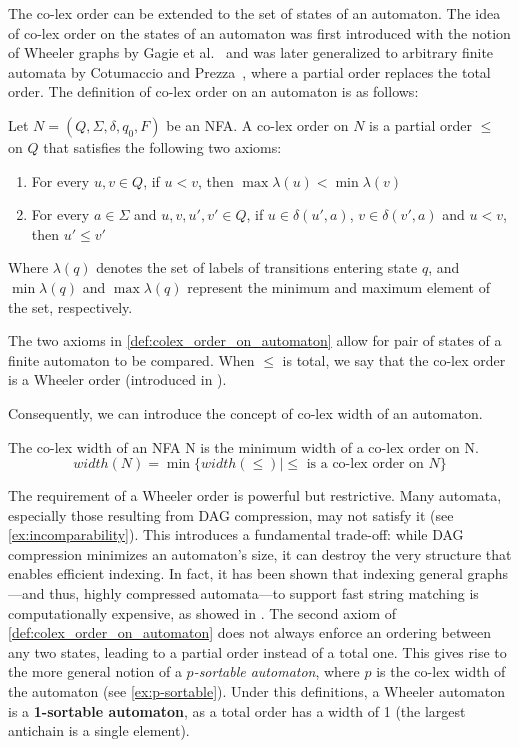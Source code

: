 The co-lex order can be extended to the set of states of an automaton. The idea of co-lex order on the states of an automaton was first introduced with the notion of Wheeler graphs by Gagie et al.~\cite{gagie2017wheeler} and was later generalized to arbitrary finite automata by Cotumaccio and Prezza~\cite{cotumaccio2021indexing}, where a partial order replaces the total order. The definition of co-lex order on an automaton is as follows:

\begin{definition}
    \label{def:colex_order_on_automaton}
    Let $N = (Q, \Sigma, \delta, q_0, F)$ be an NFA. A co-lex order on $N$ is a partial order $\leq$ on $Q$ that satisfies the following two axioms:
    \begin{enumerate}[leftmargin=25pt]
        \item For every $u, v \in Q$, if $u < v$, then $\max\lambda(u) < \min\lambda(v)$
        \item For every $a \in \Sigma$ and $u, v, u', v' \in Q$, if $u \in \delta(u', a)$, $v \in \delta(v', a)$ and $u < v$, then $u' \leq v'$
    \end{enumerate}
\end{definition}
Where $\lambda(q)$ denotes the set of labels of transitions entering state $q$, and $\min\lambda(q)$ and $\max\lambda(q)$ represent the minimum and maximum element of the set, respectively.

The two axioms in \cref{def:colex_order_on_automaton} allow for pair of states of a finite automaton to be compared. When $\leq$ is total, we say that the co-lex order is a Wheeler order (introduced in \cite{gagie2017wheeler}). 

Consequently, we can introduce the concept of co-lex width of an automaton.
\begin{definition}
    The co-lex width of an NFA N is the minimum width of a co-lex order on N.
    $$
        width(N) = \min \{width(\leq)|\leq \text{ is a co-lex order on } N\}
    $$
\end{definition}

The requirement of a Wheeler order is powerful but restrictive. Many automata, especially those resulting from DAG compression, may not satisfy it (see \cref{ex:incomparability}). This introduces a fundamental trade-off: while DAG compression minimizes an automaton's size, it can destroy the very structure that enables efficient indexing. In fact, it has been shown that indexing general graphs—and thus, highly compressed automata—to support fast string matching is computationally expensive, as showed in \cite{equiGraphsCannotBe2023}. The second axiom of \cref{def:colex_order_on_automaton} does not always enforce an ordering between any two states, leading to a partial order instead of a total one. This gives rise to the more general notion of a \textit{$p$-sortable automaton}, where $p$ is the co-lex width of the automaton (see \cref{ex:p-sortable}). Under this definitions, a Wheeler automaton is a \textbf{1-sortable automaton}, as a total order has a width of 1 (the largest antichain is a single element).


